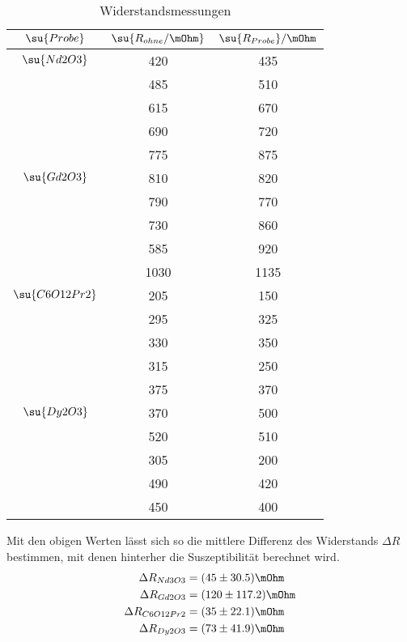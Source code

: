 \begin{table}
  \centering
  \begin{tabular}{c c c}
    \toprule
    $\su{Probe}$ & $\su{R_{ohne}/\mOhm}$ &$\su{R_{Probe}}/\mOhm$ \\
    \midrule
    $\su{Nd2O3}$   & 420 & 435 \\
                   & 485 & 510 \\
                   & 615 & 670 \\
                   & 690 & 720 \\
                   & 775 & 875 \\ \hline
    $\su{Gd2O3}$   & 810 & 820 \\
                   & 790 & 770 \\
                   & 730 & 860 \\
                   & 585 & 920 \\
                   &1030 &1135 \\ \hline
    $\su{C6O12Pr2}$& 205 & 150 \\
                   & 295 & 325 \\
                   & 330 & 350 \\
                   & 315 & 250 \\
                   & 375 & 370 \\ \hline
    $\su{Dy2O3}$   & 370 & 500 \\
                   & 520 & 510 \\
                   & 305 & 200 \\
                   & 490 & 420 \\
                   & 450 & 400 \\
    \bottomrule
  \end{tabular}
  \caption{Widerstandsmessungen}
  \label{tab:mess2}
\end{table}
Mit den obigen Werten lässt sich so die mittlere Differenz des Widerstands
$\Delta R$ bestimmen, mit denen hinterher die Suszeptibilität berechnet wird.
\begin{align*}
  \Delta R_{Nd3O3}    &= ( 45 \pm  30.5) \mOhm \\
  \Delta R_{Gd2O3}    &= (120 \pm 117.2) \mOhm \\
  \Delta R_{C6O12Pr2} &= ( 35 \pm  22.1) \mOhm \\
  \Delta R_{Dy2O3}    &= ( 73 \pm  41.9) \mOhm
\end{align*}
